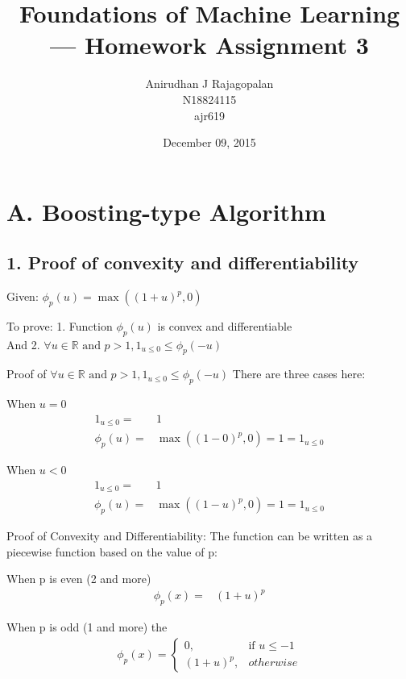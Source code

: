 \documentclass{article}
\begin{document}
\title{Foundations of Machine Learning --- Homework Assignment 3}
\date{December 09, 2015}
\author{Anirudhan J Rajagopalan\\ N18824115\\ ajr619}

\maketitle

\newpage

\section*{A. Boosting-type Algorithm}
\subsection*{1. Proof of convexity and differentiability}
\begin{description}
  \item{Given: } \( \phi_{p}(u) = \max( {(1 + u)}^{p}, 0) \)
  \item{To prove:} 1. Function \( \phi_{p}(u) \) is convex and differentiable \\ And 2. \( \forall u \in \mathbb{R} \textrm{ and } p > 1,  1_{u \le 0} \le \phi_{p}(-u) \)
  \item{Proof of \( \forall u \in \mathbb{R} \textrm{ and } p > 1,  1_{u \le 0} \le \phi_{p}(-u) \)}
    There are three cases here:
    
    When \( u = 0\)
    \begin{align*}
        1_{u \le 0} = &1 \\
        \phi_{p}(u) = & \max( {(1 - 0)}^{p}, 0) = 1 = 1_{u \le 0}
    \end{align*}

    When \( u < 0\)
    \begin{align*}
        1_{u \le 0} = &1 \\
        \phi_{p}(u) = & \max( {(1 - u)}^{p}, 0) = 1 = 1_{u \le 0}
    \end{align*}
  \item{Proof of Convexity and Differentiability:}
    The function can be written as a piecewise function based on the value of p:

    When p is even (2 and more)
    \begin{align*}
        \phi_{p}\left(x\right) = & {(1+u)}^p
    \end{align*}


    When p is odd (1 and more) the 
    \begin{align*}
        \phi_{p}\left(x\right) = 
        \begin{cases}
          0, & \textrm{if } u \le -1 \\
          {(1+u)}^p, & otherwise
        \end{cases}
    \end{align*}
\end{description}
\end{document}
